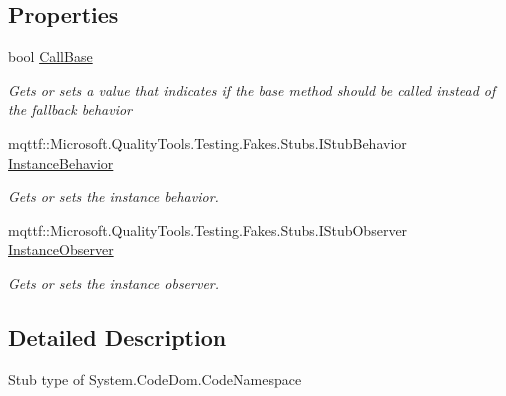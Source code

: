 \subsection*{Properties}
\begin{DoxyCompactItemize}
\item 
bool \hyperlink{class_system_1_1_code_dom_1_1_fakes_1_1_stub_code_namespace_aa88340ba2642fd78a176e430f6148b10}{Call\-Base}
\begin{DoxyCompactList}\small\item\em Gets or sets a value that indicates if the base method should be called instead of the fallback behavior\end{DoxyCompactList}\item 
mqttf\-::\-Microsoft.\-Quality\-Tools.\-Testing.\-Fakes.\-Stubs.\-I\-Stub\-Behavior \hyperlink{class_system_1_1_code_dom_1_1_fakes_1_1_stub_code_namespace_adc35d64cc86730455944ed8f8a50e48a}{Instance\-Behavior}
\begin{DoxyCompactList}\small\item\em Gets or sets the instance behavior.\end{DoxyCompactList}\item 
mqttf\-::\-Microsoft.\-Quality\-Tools.\-Testing.\-Fakes.\-Stubs.\-I\-Stub\-Observer \hyperlink{class_system_1_1_code_dom_1_1_fakes_1_1_stub_code_namespace_a63e078dbb68b80aeb07a189cc1cbc9e9}{Instance\-Observer}
\begin{DoxyCompactList}\small\item\em Gets or sets the instance observer.\end{DoxyCompactList}\end{DoxyCompactItemize}


\subsection{Detailed Description}
Stub type of System.\-Code\-Dom.\-Code\-Namespace



